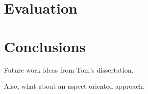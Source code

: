\documentclass{sig-alternate}
\begin{document}

\section{Evaluation}
\label{sec:evaluation}


\section{Conclusions}
\label{sec:conclusions}


Future work ideas from Tom's dissertation.

Also, what about an aspect oriented approach.

\clearpage






\end{document}

